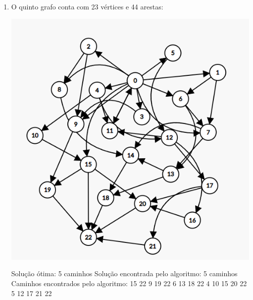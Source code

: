 \begin{enumerate}
    \item O quinto grafo conta com 23 vértices e 44 arestas:
    \begin{center}
        \includegraphics[scale=0.4]{figuras/Grafo5.png}
    \end{center}
    Solução ótima: 5 caminhos\newline
    Solução encontrada pelo algoritmo: 5 caminhos\newline
    Caminhos encontrados pelo algoritmo: 15 22  9 19 22  6 13 18 22  4 10 15 20 22  5 12 17 21 22 \newline
    

\end{enumerate}
